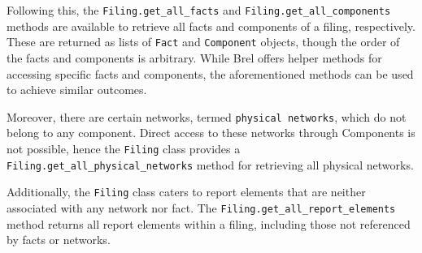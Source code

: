 Following this, the \texttt{Filing.get\_all\_facts} and \texttt{Filing.get\_all\_components} methods are available to retrieve all facts and components of a filing, respectively.
These are returned as lists of \texttt{Fact} and \texttt{Component} objects, though the order of the facts and components is arbitrary.
While Brel offers helper methods for accessing specific facts and components, the aforementioned methods can be used to achieve similar outcomes.

Moreover, there are certain networks, termed \texttt{physical networks}, which do not belong to any component.
Direct access to these networks through Components is not possible, 
hence the \texttt{Filing} class provides a \texttt{Filing.get\_all\_physical\_networks} method for retrieving all physical networks.

Additionally, the \texttt{Filing} class caters to report elements that are neither associated with any network nor fact.
The \texttt{Filing.get\_all\_report\_elements} method returns all report elements within a filing, 
including those not referenced by facts or networks.

